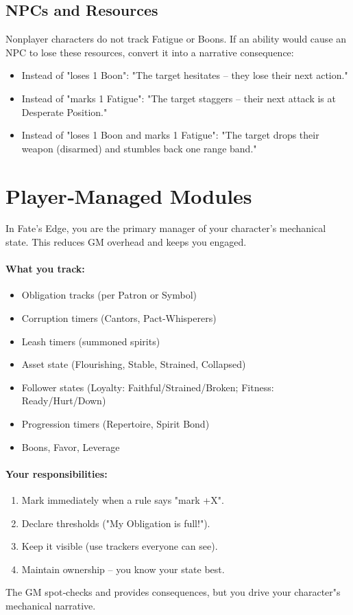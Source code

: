 \subsection{NPCs and Resources}\label{subsec:npc_resources}

Nonplayer characters do not track Fatigue or Boons. If an ability would cause an
NPC to lose these resources, convert it into a narrative consequence:
\begin{itemize}
    \item Instead of "loses 1 Boon": "The target hesitates -- they lose their next action."
    \item Instead of "marks 1 Fatigue": "The target staggers -- their next attack is at Desperate Position."
    \item Instead of "loses 1 Boon and marks 1 Fatigue": "The target drops their weapon (disarmed) and stumbles back one range band."
\end{itemize}

\section{Player‑Managed Modules}\label{sec:player_managed_modules}

In Fate's Edge, you are the primary manager of your character's mechanical state.
This reduces GM overhead and keeps you engaged.

\paragraph{What you track:}
\begin{itemize}
    \item Obligation tracks (per Patron or Symbol)
    \item Corruption timers (Cantors, Pact‑Whisperers)
    \item Leash timers (summoned spirits)
    \item Asset state (Flourishing, Stable, Strained, Collapsed)
    \item Follower states (Loyalty: Faithful/Strained/Broken; Fitness: Ready/Hurt/Down)
    \item Progression timers (Repertoire, Spirit Bond)
    \item Boons, Favor, Leverage
\end{itemize}

\paragraph{Your responsibilities:}
\begin{enumerate}
    \item Mark immediately when a rule says "mark +X".
    \item Declare thresholds ("My Obligation is full!").
    \item Keep it visible (use trackers everyone can see).
    \item Maintain ownership -- you know your state best.
\end{enumerate}
The GM spot‑checks and provides consequences, but you drive your character"s
mechanical narrative.

